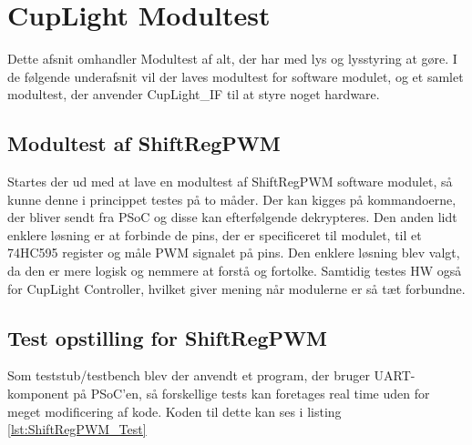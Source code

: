 \documentclass[Modultest/Modultest_main.tex]{subfiles}
\begin{document}
\section{CupLight Modultest}\label{sec:cuplight_test}
Dette afsnit omhandler Modultest af alt, der har med lys og lysstyring at gøre. I de følgende underafsnit vil der laves modultest for software modulet, og et samlet modultest, der anvender CupLight\_IF til at styre noget hardware.

\subsection{Modultest af ShiftRegPWM}
Startes der ud med at lave en modultest af ShiftRegPWM software modulet, så kunne denne i princippet testes på to måder. Der kan kigges på kommandoerne, der bliver sendt fra PSoC og disse kan efterfølgende dekrypteres. Den anden lidt enklere løsning er at forbinde de pins, der er specificeret til modulet, til et 74HC595 register og måle PWM signalet på pins. Den enklere løsning blev valgt, da den er mere logisk og nemmere at forstå og fortolke. Samtidig testes HW også for CupLight Controller, hvilket giver mening når modulerne er så tæt forbundne.
\subsection{Test opstilling for ShiftRegPWM}
Som teststub/testbench blev der anvendt et program, der bruger UART-komponent på PSoC'en, så forskellige tests kan foretages real time uden for meget modificering af kode. Koden til dette kan ses i listing \ref{lst:ShiftRegPWM_Test}
\end{document}
